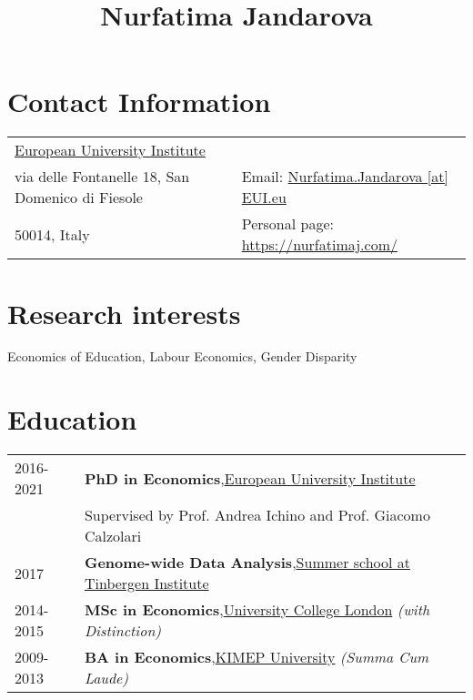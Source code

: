 \documentclass{article}
\title{Nurfatima Jandarova}
\date{}
\begin{document}
    \maketitle


    \section*{Contact Information}
    \begin{table}[H]
      \begin{tabular}{ll}\href{https://www.eui.eu/}{European University Institute}&\\
        via delle Fontanelle 18, San Domenico di Fiesole&
        Email: \href{mailto:Nurfatima.Jandarova [at] EUI.eu}{Nurfatima.Jandarova [at] EUI.eu} \\
        50014, Italy& Personal page: \href{https://nurfatimaj.com/}{https://nurfatimaj.com/}
      \end{tabular}
    \end{table}

    \section*{Research interests}Economics of Education, Labour Economics, Gender Disparity

    \section*{Education}\begin{table}[H]
        \begin{tabular}{p{2cm}p{14cm}}
            2016-2021 & \textbf{ PhD in Economics},\href{https://www.eui.eu}{European University Institute}\\ & Supervised by Prof. Andrea Ichino and Prof. Giacomo Calzolari\\
            2017 & \textbf{ Genome-wide Data Analysis},\href{https://www.tinbergen.nl/home}{Summer school at Tinbergen Institute}\\
            2014-2015 & \textbf{ MSc in Economics},\href{https://www.ucl.ac.uk}{University College London}\textit{ (with Distinction) }\\
            2009-2013 & \textbf{ BA in Economics},\href{https://www.kimep.kz/en}{KIMEP University}\textit{ (Summa Cum Laude) }\\
        \end{tabular}
      \end{table}
\end{document}
